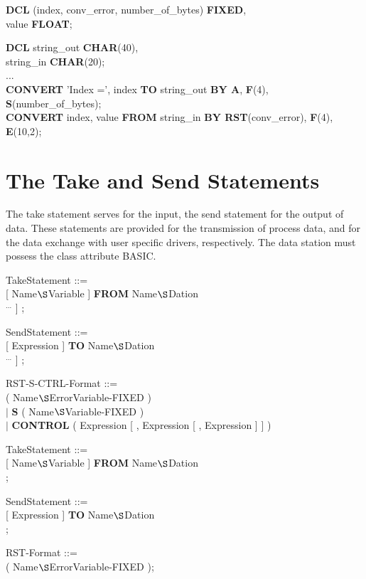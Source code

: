 \begin{removed}
\begin{tabbing}
{\bf DCL} (index, conv\_error, number\_of\_bytes) \= {\bf FIXED},\\
\x        value                                   \> {\bf FLOAT};\\
\end{tabbing}

{\bf DCL} string\_out {\bf CHAR}(40),\\
\x string\_in {\bf CHAR}(20);\\
...\\
{\bf CONVERT} 'Index =', index {\bf TO} string\_out 
    {\bf BY A}, {\bf F}(4), {\bf S}(number\_of\_bytes);\\
{\bf CONVERT} index, value {\bf FROM} string\_in {\bf BY RST}(conv\_error), {\bf F}(4), {\bf E}(10,2);
\end{removed}

\section{The Take and Send Statements}    %
\label{sec_take_send}

The take statement serves for the input, the send statement for the
output of data. These statements are provided for the transmission of
process data, and for the data exchange with user specific drivers,
respectively. The data station must possess the class attribute BASIC.

\begin{removed}
TakeStatement ::=\\
 [ Name$\S $Variable ] {\bf FROM} Name$\S $Dation\\
\x \x [ {\bf BY} RST-S-CTRL-Format [ , RST-S-CTRL-Format ] $^{...}$ ] ;

SendStatement ::=\\
 [ Expression ] {\bf TO} Name$\S $Dation\\
\x \x [ {\bf BY} RST-S-CTRL-Format [ , RST-S-CTRL-Format ] $^{...}$ ] ;

RST-S-CTRL-Format ::=\\
 ( Name$\S $ErrorVariable-FIXED )\\
\x $\mid$ {\bf S} ( Name$\S $Variable-FIXED )\\
\x $\mid$ {\bf CONTROL} ( Expression [ , Expression [ , Expression ] ] )
\end{removed}
\begin{accepted}
TakeStatement ::=\\
 [ Name$\S $Variable ] {\bf FROM} Name$\S $Dation\\
\x {} ;

SendStatement ::=\\
 [ Expression ] {\bf TO} Name$\S $Dation\\
\x {} ;

RST-Format ::=\\
 ( Name$\S $ErrorVariable-FIXED );
\end{accepted}

